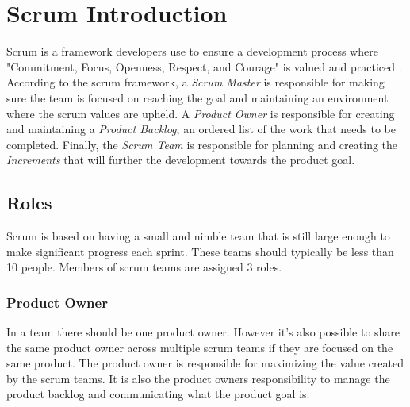 



\section{Scrum Introduction}
Scrum is a framework developers use to ensure a development process where "Commitment, Focus, Openness, Respect, and Courage" is valued and practiced \cite{schwaber_sutherland_2022}. According to the scrum framework, a \emph{Scrum Master} is responsible for making sure the team is focused on reaching the goal and maintaining an environment where the scrum values are upheld. A \emph{Product Owner} is responsible for creating and maintaining a \emph{Product Backlog}, an ordered list of the work that needs to be completed. Finally, the \emph{Scrum Team} is responsible for planning and creating the \emph{Increments} that will further the development towards the product goal.



\subsection{Roles}
Scrum is based on having a small and nimble team that is still large enough to make significant progress each sprint. 
These teams should typically be less than 10 people.
Members of scrum teams are assigned 3 roles. \cite{schwaber_sutherland_2022}

\subsubsection{Product Owner}
In a team there should be one product owner. However it's also possible to share the same product owner across multiple scrum teams if they are focused on the same product.
The product owner is responsible for maximizing the value created by the scrum teams. It is also the product owners responsibility to manage the product backlog and communicating what the product goal is. \cite{schwaber_sutherland_2022}

